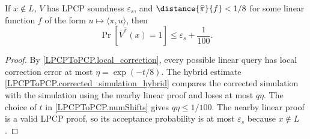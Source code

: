 \begin{lemma}
\label{LPCPToPCP.verifier_soundness_near_case}
\leanok
If \(x\notin L\), \(V\) has LPCP soundness \(\varepsilon_s\), and
\(\distance{\widehat{\pi}}{f} < 1/8\) for some linear function \(f\) of the form \(u\mapsto\langle\pi,u\rangle\), then
\[
  \Pr[\overline V^{\widehat{\pi}}(x)=1]\leq \varepsilon_s+\frac{1}{100}.
\]
\end{lemma}
\begin{proof}\leanok
By \ref{LPCPToPCP.local_correction}, every possible linear query has local
correction error at most \(\eta=\exp(-t/8)\). The hybrid estimate
\ref{LPCPToPCP.corrected_simulation_hybrid} compares the corrected simulation
with the simulation using the nearby linear proof and loses at most
\(q\eta\). The choice of \(t\) in \ref{LPCPToPCP.numShifts} gives
\(q\eta\le 1/100\). The nearby linear proof is a valid LPCP proof, so its
acceptance probability is at most \(\varepsilon_s\) because \(x\notin L\).



\end{proof}
